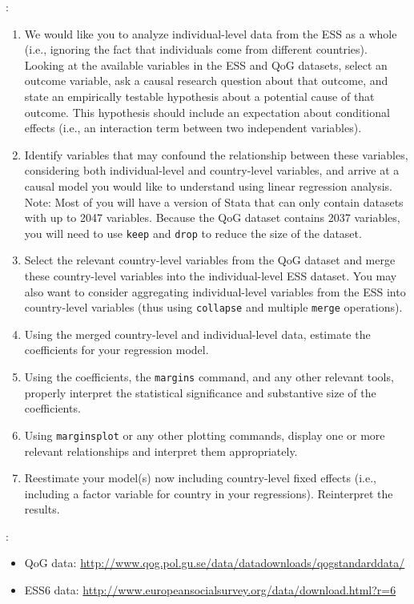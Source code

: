 \documentclass[a4paper,11pt]{article}
\begin{document}
:
\begin{enumerate}\itemsep1em
\item We would like you to analyze individual-level data from the ESS as a whole (i.e., ignoring the fact that individuals come from different countries). Looking at the available variables in the ESS and QoG datasets, select an outcome variable, ask a causal research question about that outcome, and state an empirically testable hypothesis about a potential cause of that outcome. This hypothesis should include an expectation about conditional effects (i.e., an interaction term between two independent variables).
\item Identify variables that may confound the relationship between these variables, considering both individual-level and country-level variables, and arrive at a causal model you would like to understand using linear regression analysis. Note: Most of you will have a version of Stata that can only contain datasets with up to 2047 variables. Because the QoG dataset contains 2037 variables, you will need to use \texttt{keep} and \texttt{drop} to reduce the size of the dataset.
\item Select the relevant country-level variables from the QoG dataset and merge these country-level variables into the individual-level ESS dataset. You may also want to consider aggregating individual-level variables from the ESS into country-level variables (thus using \texttt{collapse} and multiple \texttt{merge} operations).
\item Using the merged country-level and individual-level data, estimate the coefficients for your regression model.
\item Using the coefficients, the \texttt{margins} command, and any other relevant tools, properly interpret the statistical significance and substantive size of the coefficients.
\item Using \texttt{marginsplot} or any other plotting commands, display one or more relevant relationships and interpret them appropriately.
\item Reestimate your model(s) now including country-level fixed effects (i.e., including a factor variable for country in your regressions). Reinterpret the results.
\end{enumerate}

\vspace{1em}

:
\begin{itemize}
\item QoG data: \url{http://www.qog.pol.gu.se/data/datadownloads/qogstandarddata/}
\item ESS6 data: \url{http://www.europeansocialsurvey.org/data/download.html?r=6}
\end{itemize}
\end{document}
